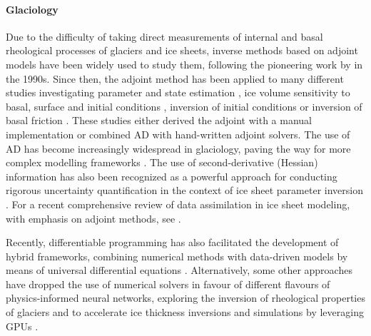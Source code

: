 \paragraph{Glaciology}

Due to the difficulty of taking direct measurements of internal and basal rheological processes of glaciers and ice sheets, inverse methods based on adjoint models have been widely used to study them, following the pioneering work by \cite{macayeal1992basal} in the 1990s. 
Since then, the adjoint method has been applied to many different studies investigating parameter and state estimation \cite{Vieli.2006, goldberg2013parameter}, ice volume sensitivity to basal, surface and initial conditions \cite{heimbach2009greenland}, inversion of initial conditions \cite{mosbeux2016comparison} or inversion of basal friction \cite{Petra.2012, morlighem2013inversion}.
These studies either derived the adjoint with a manual implementation or combined AD with hand-written adjoint solvers. 
The use of AD has become increasingly widespread in glaciology, paving the way for more complex modelling frameworks \cite{hascoet2018source, Gaikwad.2023}. 
The use of second-derivative (Hessian) information has also been recognized as a powerful approach for conducting rigorous uncertainty quantification in the context of ice sheet parameter inversion \cite{Petra.2014,Isaac:2015hf}.
For a recent comprehensive review of data assimilation in ice sheet modeling, with emphasis on adjoint methods, see \cite{Morlighem.2023}.

Recently, differentiable programming has also facilitated the development of hybrid frameworks, combining numerical methods with data-driven models by means of universal differential equations \cite{BolibarSapienza_UDEs}. 
Alternatively, some other approaches have dropped the use of numerical solvers in favour of different flavours of physics-informed neural networks, exploring the inversion of rheological properties of glaciers \cite{wang2022discovering} and to accelerate ice thickness inversions and simulations by leveraging GPUs \cite{Jouvet_Cordonnier_Kim_Lüthi_Vieli_Aschwanden_2021, jouvet2023inversion}. 




